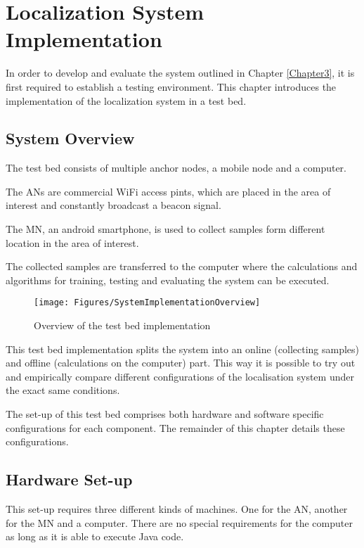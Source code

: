 \chapter{Localization System Implementation}

\label{Chapter4}

In order to develop and evaluate the system outlined in Chapter \ref{Chapter3}, it is first required to establish a testing environment.
This chapter introduces the implementation of the localization system in a test bed.

\section{System Overview}

The test bed consists of multiple anchor nodes, a mobile node and a computer.

The ANs are commercial WiFi access pints, which are placed in the area of interest and constantly broadcast a beacon signal.

The MN, an android smartphone, is used to collect samples form different location in the area of interest. 

The collected samples are transferred to the computer where the calculations and algorithms for training, testing and evaluating the system can be executed.

\begin{figure}[ht]
\centering
\texttt{[image: Figures/SystemImplementationOverview]}
\decoRule
\caption[Test bed implementation overview]{Overview of the test bed implementation}
\label{fig:localizationSystemOverview}
\end{figure}

This test bed implementation splits the system into an online (collecting samples) and offline (calculations on the computer) part. This way it is possible to try out and empirically compare different configurations of the localisation system under the exact same conditions.

The set-up of this test bed comprises both hardware and software specific configurations for each component. The remainder of this chapter details these configurations.

\section{Hardware Set-up}

This set-up requires three different kinds of machines. One for the AN, another for the MN and a computer. There are no special requirements for the computer as long as it is able to execute Java code.

